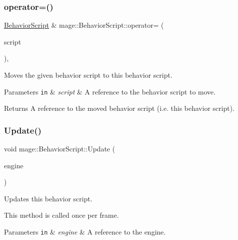 \subsubsection{\texorpdfstring{operator=()}{operator=()}\hspace{0.1cm}{\footnotesize\ttfamily [2/2]}}
{\footnotesize\ttfamily \hyperlink{classmage_1_1_behavior_script}{Behavior\+Script} \& mage\+::\+Behavior\+Script\+::operator= (\begin{DoxyParamCaption}\item[{\hyperlink{classmage_1_1_behavior_script}{Behavior\+Script} \&\&}]{script }\end{DoxyParamCaption})\hspace{0.3cm}{\ttfamily [default]}, {\ttfamily [noexcept]}}

Moves the given behavior script to this behavior script.


\begin{DoxyParams}[1]{Parameters}
\mbox{\tt in}  & {\em script} & A reference to the behavior script to move. \\
\hline
\end{DoxyParams}
\begin{DoxyReturn}{Returns}
A reference to the moved behavior script (i.\+e. this behavior script). 
\end{DoxyReturn}
\hypertarget{classmage_1_1_behavior_script_a085634661326b59850c1111e537baa4e}{}\label{classmage_1_1_behavior_script_a085634661326b59850c1111e537baa4e} 
\subsubsection{\texorpdfstring{Update()}{Update()}}
{\footnotesize\ttfamily void mage\+::\+Behavior\+Script\+::\+Update (\begin{DoxyParamCaption}\item[{\mbox{[}\mbox{[}maybe\+\_\+unused\mbox{]} \mbox{]} \hyperlink{classmage_1_1_engine}{Engine} \&}]{engine }\end{DoxyParamCaption})\hspace{0.3cm}{\ttfamily [virtual]}}

Updates this behavior script.

This method is called once per frame.


\begin{DoxyParams}[1]{Parameters}
\mbox{\tt in}  & {\em engine} & A reference to the engine. \\
\hline
\end{DoxyParams}

